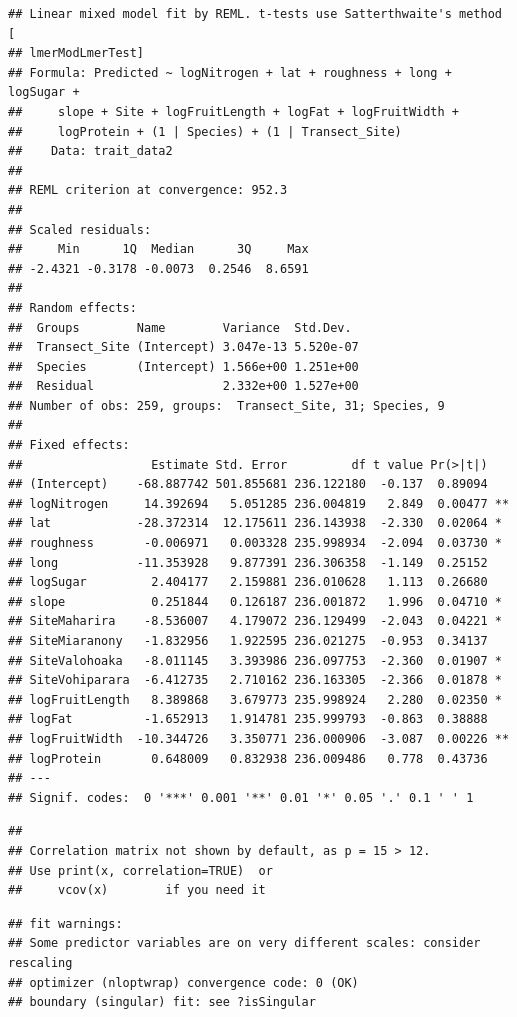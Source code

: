 \documentclass[
  12pt,
]{article}
\begin{document}
\begin{verbatim}
## Linear mixed model fit by REML. t-tests use Satterthwaite's method [
## lmerModLmerTest]
## Formula: Predicted ~ logNitrogen + lat + roughness + long + logSugar +  
##     slope + Site + logFruitLength + logFat + logFruitWidth +  
##     logProtein + (1 | Species) + (1 | Transect_Site)
##    Data: trait_data2
## 
## REML criterion at convergence: 952.3
## 
## Scaled residuals: 
##     Min      1Q  Median      3Q     Max 
## -2.4321 -0.3178 -0.0073  0.2546  8.6591 
## 
## Random effects:
##  Groups        Name        Variance  Std.Dev. 
##  Transect_Site (Intercept) 3.047e-13 5.520e-07
##  Species       (Intercept) 1.566e+00 1.251e+00
##  Residual                  2.332e+00 1.527e+00
## Number of obs: 259, groups:  Transect_Site, 31; Species, 9
## 
## Fixed effects:
##                  Estimate Std. Error         df t value Pr(>|t|)   
## (Intercept)    -68.887742 501.855681 236.122180  -0.137  0.89094   
## logNitrogen     14.392694   5.051285 236.004819   2.849  0.00477 **
## lat            -28.372314  12.175611 236.143938  -2.330  0.02064 * 
## roughness       -0.006971   0.003328 235.998934  -2.094  0.03730 * 
## long           -11.353928   9.877391 236.306358  -1.149  0.25152   
## logSugar         2.404177   2.159881 236.010628   1.113  0.26680   
## slope            0.251844   0.126187 236.001872   1.996  0.04710 * 
## SiteMaharira    -8.536007   4.179072 236.129499  -2.043  0.04221 * 
## SiteMiaranony   -1.832956   1.922595 236.021275  -0.953  0.34137   
## SiteValohoaka   -8.011145   3.393986 236.097753  -2.360  0.01907 * 
## SiteVohiparara  -6.412735   2.710162 236.163305  -2.366  0.01878 * 
## logFruitLength   8.389868   3.679773 235.998924   2.280  0.02350 * 
## logFat          -1.652913   1.914781 235.999793  -0.863  0.38888   
## logFruitWidth  -10.344726   3.350771 236.000906  -3.087  0.00226 **
## logProtein       0.648009   0.832938 236.009486   0.778  0.43736   
## ---
## Signif. codes:  0 '***' 0.001 '**' 0.01 '*' 0.05 '.' 0.1 ' ' 1
\end{verbatim}

\begin{verbatim}
## 
## Correlation matrix not shown by default, as p = 15 > 12.
## Use print(x, correlation=TRUE)  or
##     vcov(x)        if you need it
\end{verbatim}

\begin{verbatim}
## fit warnings:
## Some predictor variables are on very different scales: consider rescaling
## optimizer (nloptwrap) convergence code: 0 (OK)
## boundary (singular) fit: see ?isSingular
\end{verbatim}
\end{document}
